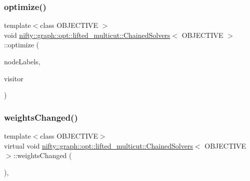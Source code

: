 \subsubsection{\texorpdfstring{optimize()}{optimize()}}
{\footnotesize\ttfamily template$<$class O\+B\+J\+E\+C\+T\+I\+VE $>$ \\
void \hyperlink{classnifty_1_1graph_1_1opt_1_1lifted__multicut_1_1ChainedSolvers}{nifty\+::graph\+::opt\+::lifted\+\_\+multicut\+::\+Chained\+Solvers}$<$ O\+B\+J\+E\+C\+T\+I\+VE $>$\+::optimize (\begin{DoxyParamCaption}\item[{\hyperlink{classnifty_1_1graph_1_1opt_1_1lifted__multicut_1_1ChainedSolvers_a8c2130c9b1a596d14098018c54b8f976}{Node\+Labels\+Type} \&}]{node\+Labels,  }\item[{\hyperlink{classnifty_1_1graph_1_1opt_1_1lifted__multicut_1_1ChainedSolvers_ac33a800e2d3542a35679d01a334e1751}{Visitor\+Base\+Type} $\ast$}]{visitor }\end{DoxyParamCaption})\hspace{0.3cm}{\ttfamily [virtual]}}

\mbox{\label{classnifty_1_1graph_1_1opt_1_1lifted__multicut_1_1ChainedSolvers_a68158bd1f3cf0198769e52635989b9b6}} 
\subsubsection{\texorpdfstring{weights\+Changed()}{weightsChanged()}}
{\footnotesize\ttfamily template$<$class O\+B\+J\+E\+C\+T\+I\+VE$>$ \\
virtual void \hyperlink{classnifty_1_1graph_1_1opt_1_1lifted__multicut_1_1ChainedSolvers}{nifty\+::graph\+::opt\+::lifted\+\_\+multicut\+::\+Chained\+Solvers}$<$ O\+B\+J\+E\+C\+T\+I\+VE $>$\+::weights\+Changed (\begin{DoxyParamCaption}{ }\end{DoxyParamCaption})\hspace{0.3cm}{\ttfamily [inline]}, {\ttfamily [virtual]}}



